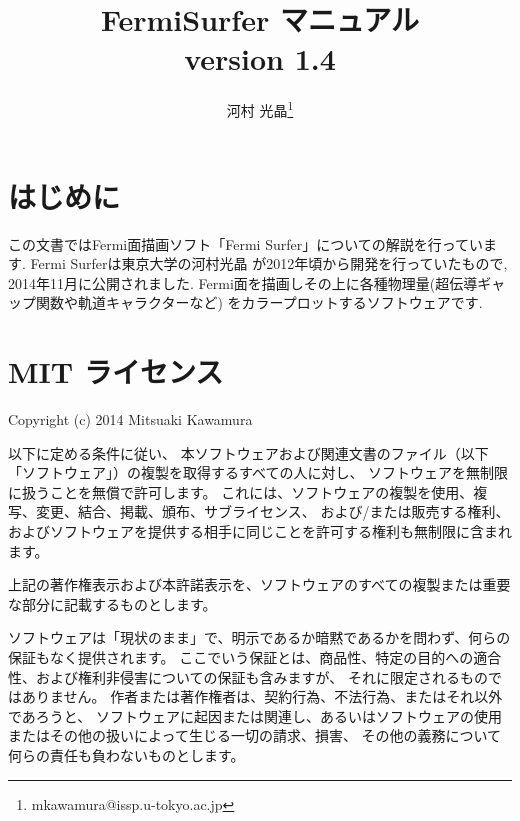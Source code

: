 \documentclass[12pt]{jarticle}
\begin{document}
%
%
\title{FermiSurfer マニュアル \\
version 1.4}
\author{河村 光晶\footnote{mkawamura@issp.u-tokyo.ac.jp}}
\maketitle

\tableofcontents

\section{はじめに}

この文書ではFermi面描画ソフト「Fermi Surfer」についての解説を行っています. 
Fermi Surferは東京大学の河村光晶
が2012年頃から開発を行っていたもので, 
2014年11月に公開されました. 
Fermi面を描画しその上に各種物理量(超伝導ギャップ関数や軌道キャラクターなど)
をカラープロットするソフトウェアです. 

\section{MIT ライセンス}

Copyright (c) 2014 Mitsuaki Kawamura

\vspace{0.5cm}
以下に定める条件に従い、
本ソフトウェアおよび関連文書のファイル（以下「ソフトウェア」）の複製を取得するすべての人に対し、
ソフトウェアを無制限に扱うことを無償で許可します。
これには、ソフトウェアの複製を使用、複写、変更、結合、掲載、頒布、サブライセンス、
および/または販売する権利、およびソフトウェアを提供する相手に同じことを許可する権利も無制限に含まれます。

\vspace{0.5cm}
上記の著作権表示および本許諾表示を、ソフトウェアのすべての複製または重要な部分に記載するものとします。

\vspace{0.5cm}
ソフトウェアは「現状のまま」で、明示であるか暗黙であるかを問わず、何らの保証もなく提供されます。
ここでいう保証とは、商品性、特定の目的への適合性、および権利非侵害についての保証も含みますが、
それに限定されるものではありません。 作者または著作権者は、契約行為、不法行為、またはそれ以外であろうと、
ソフトウェアに起因または関連し、あるいはソフトウェアの使用またはその他の扱いによって生じる一切の請求、損害、
その他の義務について何らの責任も負わないものとします。 
\end{document}
